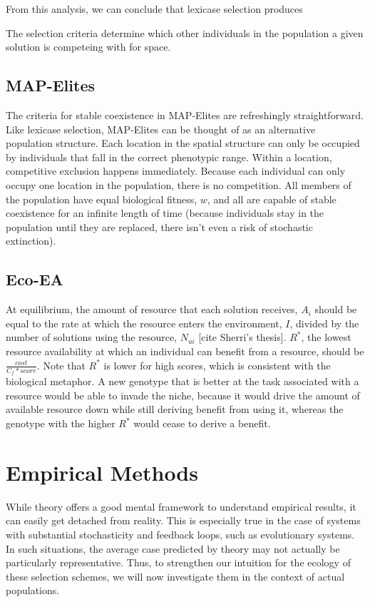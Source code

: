 From this analysis, we can conclude that lexicase selection produces 

The selection criteria determine which other individuals in the population a given solution is competeing with for space. 

\subsection{MAP-Elites}

The criteria for stable coexistence in MAP-Elites are refreshingly straightforward. Like lexicase selection, MAP-Elites can be thought of as an alternative population structure. Each location in the spatial structure can only be occupied by individuals that fall in the correct phenotypic range. Within a location, competitive exclusion happens immediately. Because each individual can only occupy one location in the population, there is no competition. All members of the population have equal biological fitness, $w$, and all are capable of stable coexistence for an infinite length of time (because individuals stay in the population until they are replaced, there isn't even a risk of stochastic extinction).

\subsection{Eco-EA}

At equilibrium, the amount of resource that each solution receives, $A_{i}$ should be equal to the rate at which the resource enters the environment, $I$, divided by the number of solutions using the resource, $N_{ui}$ [cite Sherri's thesis]. $R^{*}$, the lowest resource availability at which an individual can benefit from a resource, should be $\frac{cost}{C_{f}*score}$. Note that $R^{*}$ is lower for high scores, which is consistent with the biological metaphor. A new genotype that is better at the task associated with a resource would be able to invade the niche, because it would drive the amount of available resource down while still deriving benefit from using it, whereas the genotype with the higher $R^{*}$ would cease to derive a benefit. 

\section{Empirical Methods}

While theory offers a good mental framework to understand empirical results, it can easily get detached from reality. This is especially true in the case of systems with substantial stochasticity and feedback loops, such as evolutionary systems. In such situations, the average case predicted by theory may not actually be particularly representative. Thus, to strengthen our intuition for the ecology of these selection schemes, we will now investigate them in the context of actual populations. 

